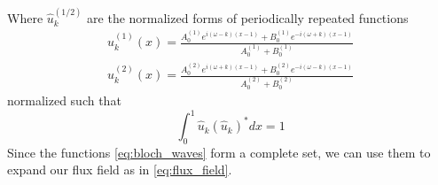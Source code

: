 %
Where $\hat{u}_{k}^{(1/2)}$ are the normalized forms of periodically repeated functions
\begin{gather}
      u_{k}^{(1)}(x) = 
      \frac{A_0^{(1)} e^{i(\omega-k)(x-1)} + B_0^{(1)} e^{-i(\omega+k)(x-1)}}{A_0^{(1)}+B_0^{(1)}}\\
       u_{k}^{(2)}(x) =
      \frac{A_0^{(2)} e^{i(\omega+k)(x-1)} + B_0^{(2)} e^{-i(\omega-k)(x-1)}}{A_0^{(2)}+B_0^{(2)}}
\end{gather}
%
normalized such that
\begin{equation}
\int_0^1 \hat{u}_{k} (\hat{u}_{k})^* dx = 1
\end{equation}
%
Since the functions \ref{eq:bloch_waves} form a complete set, we can use them to expand our flux field as in \ref{eq:flux_field}.
%